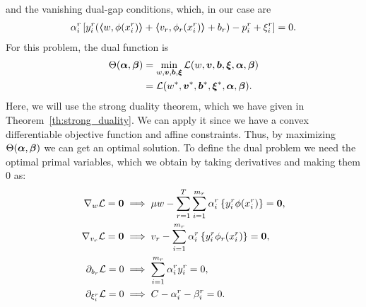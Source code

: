 and the vanishing dual-gap conditions, which, in our case are
\begin{align}
    \alpha_i^r \left[ y_{i}^r (\dotp{w}{\phi(x_{i}^r)} + \dotp{v_r}{\phi_r(x_{i}^r)} + b_r) - p_{i}^r + \xi_{i}^r \right] = 0 . \label{eq:dualgap_vanish}
\end{align}
For this problem, the dual function is
\begin{equation}\nonumber
    \begin{aligned}
         \Theta(\bm{\alpha}, \bm{\beta}) &=  \min_{{w}, \bm{v}, \bm{b}, \bm{\xi}} \mathcal{L}({w}, \bm{v}, \bm{b}, \bm{\xi}, \bm{\alpha}, \bm{\beta}) \\
         &= \mathcal{L}({{w}}^*, {\bm{v}}^*, {\bm{b}}^*, {\bm{\xi}}^*, \bm{\alpha}, \bm{\beta}) .
    \end{aligned}    
\end{equation}
Here, we will use the strong duality theorem, which we have given in Theorem~\ref{th:strong_duality}. We can apply it since we have a convex differentiable objective function and affine constraints.
Thus, by maximizing $\Theta(\bm{\alpha}, \bm{\beta})$ we can get an optimal solution.
To define the dual problem we need the optimal primal variables, which we obtain by taking derivatives and making them $0$ as:
\begin{align}
    \grad_{{w}} \lagr  = \fv{0}  &\implies \mu {{w}} - \sum_{r= 1}^T \sum_{i=1}^{m_r} {\alpha_i^r} \left\lbrace y_i^r \phi(x_i^r) \right\rbrace = \fv{0} , \label{eq:common_repr_add} \\
    \grad_{{v}_r} \lagr  = \fv{0} &\implies {{v}_r} - \sum_{i=1}^{m_r} {\alpha_i^r} \left\lbrace y_i^r \phi_r(x_i^r) \right\rbrace = \fv{0} , \label{eq:specific_repr_add} \\
    \partial_{b_r} \lagr  = 0 &\implies \sum_{i=1}^{m_r} {\alpha_i^r} y_i^r = 0 , \label{eq:specific_eqconstr_add} \\
    \partial_{\xi_i^r} \lagr  = 0 &\implies C - {\alpha_i^r} - {\beta_i^r} = 0 .\label{eq:xi_feas_add}
\end{align}
